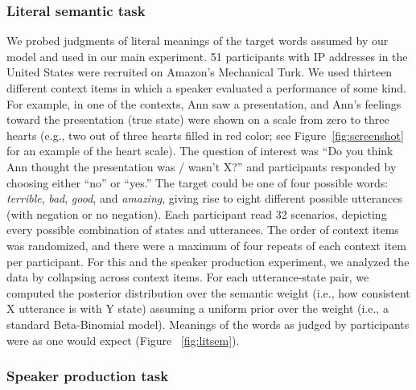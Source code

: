 \documentclass[12pt]{article}
\begin{document}
\subsubsection*{Literal semantic task}\label{literal-semantic-task}

We probed judgments of literal meanings of the target words assumed by
our model and used in our main experiment. 51 participants with IP
addresses in the United States were recruited on Amazon's Mechanical
Turk. We used thirteen different context items in which a speaker
evaluated a performance of some kind. For example, in one of the
contexts, Ann saw a presentation, and Ann's feelings toward the
presentation (true state) were shown on a scale from zero to three
hearts (e.g., two out of three hearts filled in red color; see
Figure~\ref{fig:screenshot} for an example of the heart scale). The
question of interest was \enquote{Do you think Ann thought the
presentation was / wasn't X?} and participants responded by choosing
either \enquote{no} or \enquote{yes.} The target could be one of four
possible words: \emph{terrible}, \emph{bad}, \emph{good}, and
\emph{amazing}, giving rise to eight different possible utterances (with
negation or no negation). Each participant read 32 scenarios, depicting
every possible combination of states and utterances. The order of
context items was randomized, and there were a maximum of four repeats
of each context item per participant. For this and the speaker
production experiment, we analyzed the data by collapsing across context
items. For each utterance-state pair, we computed the posterior
distribution over the semantic weight (i.e., how consistent X utterance
is with Y state) assuming a uniform prior over the weight (i.e., a
standard Beta-Binomial model). Meanings of the words as judged by
participants were as one would expect (Figure ~\ref{fig:litsem}).

\subsubsection*{Speaker production task}\label{speaker-production-task}
\end{document}
